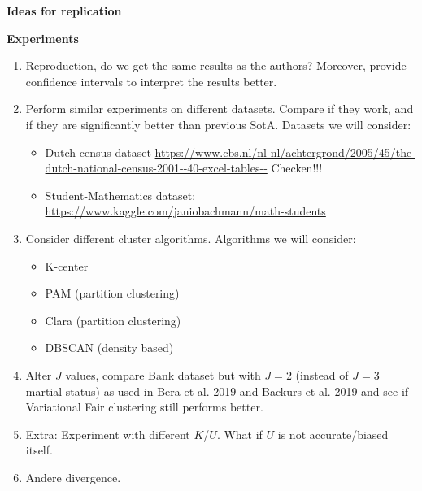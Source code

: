 \documentclass{article}
\begin{document}
{\Large \textbf{Ideas for replication}}

\bigskip

\textbf{Experiments}

\begin{enumerate}
    \item Reproduction, do we get the same results as the authors? Moreover, provide confidence intervals to interpret the results better.
    \item Perform similar experiments on different datasets. Compare if they work, and if they are significantly better than previous SotA. Datasets we will consider:
    \begin{itemize}
        \item Dutch census dataset \url{https://www.cbs.nl/nl-nl/achtergrond/2005/45/the-dutch-national-census-2001--40-excel-tables--} Checken!!!
        \item Student-Mathematics dataset: \url{https://www.kaggle.com/janiobachmann/math-students}
    \end{itemize}
    \item Consider different cluster algorithms. Algorithms we will consider:
    \begin{itemize}
        \item K-center 
        \item PAM (partition clustering)
        \item Clara (partition clustering)
        \item DBSCAN (density based)
    \end{itemize}
    \item Alter $J$ values, compare Bank dataset but with $J = 2$ (instead of $J=3$ martial status) as used in Bera et al. 2019 and Backurs et al. 2019 and see if Variational Fair clustering still performs better. 
    \item Extra: Experiment with different $K$/$U$. What if $U$ is not accurate/biased itself. 
    \item Andere divergence.
\end{enumerate}
\end{document}
